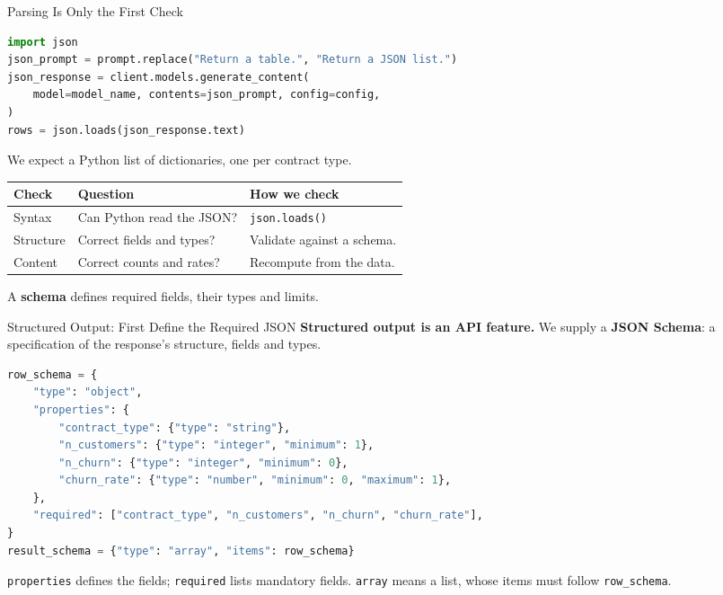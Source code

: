 \documentclass[aspectratio=169]{beamer}
\begin{document}
\begin{frame}[fragile]{Parsing Is Only the First Check}
\begin{lstlisting}[language=Python]
import json
json_prompt = prompt.replace("Return a table.", "Return a JSON list.")
json_response = client.models.generate_content(
    model=model_name, contents=json_prompt, config=config,
)
rows = json.loads(json_response.text)
\end{lstlisting}
  \small We expect a Python list of dictionaries, one per contract type.
  \par\vspace{0.3em}
  \renewcommand{\arraystretch}{1.2}
  \begin{tabular}{@{}p{2.2cm}p{4.7cm}p{5.2cm}@{}}
    \toprule
    \textbf{Check} & \textbf{Question} & \textbf{How we check} \\
    \midrule
    Syntax & Can Python read the JSON? & \texttt{json.loads()} \\
    Structure & Correct fields and types? & Validate against a schema. \\
    Content & Correct counts and rates? & Recompute from the data. \\
    \bottomrule
  \end{tabular}
  \par\vspace{0.4em}
  \small A \textbf{schema} defines required fields, their types and limits.
\end{frame}

\begin{frame}[fragile]{Structured Output: First Define the Required JSON}
  \small \textbf{Structured output is an API feature.} We supply a \textbf{JSON Schema}: a specification of the response's structure, fields and types.
\begin{lstlisting}[language=Python]
row_schema = {
    "type": "object",
    "properties": {
        "contract_type": {"type": "string"},
        "n_customers": {"type": "integer", "minimum": 1},
        "n_churn": {"type": "integer", "minimum": 0},
        "churn_rate": {"type": "number", "minimum": 0, "maximum": 1},
    },
    "required": ["contract_type", "n_customers", "n_churn", "churn_rate"],
}
result_schema = {"type": "array", "items": row_schema}
\end{lstlisting}
  \small \texttt{properties} defines the fields; \texttt{required} lists mandatory fields. \texttt{array} means a list, whose items must follow \texttt{row\_schema}.
\end{frame}
\end{document}
